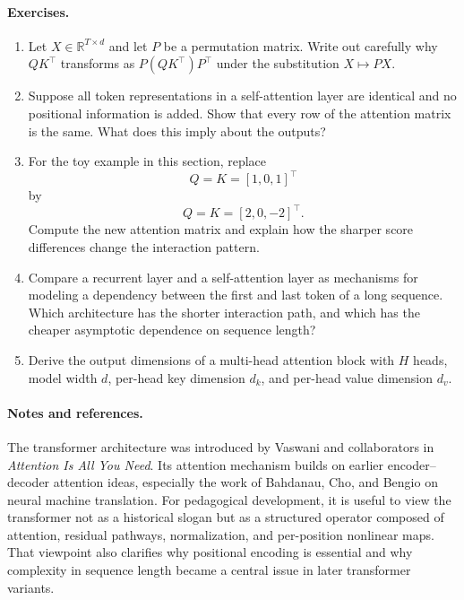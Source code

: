 \paragraph{Exercises.}
\begin{enumerate}
    \item Let \(X \in \mathbb{R}^{T \times d}\) and let \(P\) be a permutation matrix.
    Write out carefully why \(QK^{\top}\) transforms as \(P(QK^{\top})P^{\top}\) under the substitution \(X \mapsto PX\).
    \item Suppose all token representations in a self-attention layer are identical and no positional information is added.
    Show that every row of the attention matrix is the same.
    What does this imply about the outputs?
    \item For the toy example in this section, replace
    \[
    Q = K = [1,0,1]^{\top}
    \]
    by
    \[
    Q = K = [2,0,-2]^{\top}.
    \]
    Compute the new attention matrix and explain how the sharper score differences change the interaction pattern.
    \item Compare a recurrent layer and a self-attention layer as mechanisms for modeling a dependency between the first and last token of a long sequence.
    Which architecture has the shorter interaction path, and which has the cheaper asymptotic dependence on sequence length?
    \item Derive the output dimensions of a multi-head attention block with \(H\) heads, model width \(d\), per-head key dimension \(d_k\), and per-head value dimension \(d_v\).
\end{enumerate}

\paragraph{Notes and references.}
The transformer architecture was introduced by Vaswani and collaborators in \emph{Attention Is All You Need}.
Its attention mechanism builds on earlier encoder--decoder attention ideas, especially the work of Bahdanau, Cho, and Bengio on neural machine translation.
For pedagogical development, it is useful to view the transformer not as a historical slogan but as a structured operator composed of attention, residual pathways, normalization, and per-position nonlinear maps.
That viewpoint also clarifies why positional encoding is essential and why complexity in sequence length became a central issue in later transformer variants.
